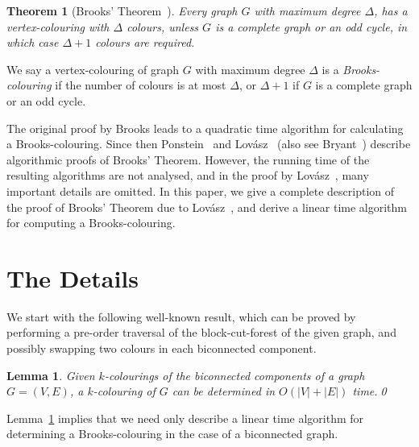 \documentclass{article}
\newtheorem{lemma}{Lemma}
\newtheorem{theorem}{Theorem}
\begin{document}
\begin{theorem}[Brooks' Theorem~\cite{Brooks41}]
Every graph $G$ with maximum degree $\Delta$, has a vertex-colouring with $\Delta$
colours, unless $G$ is a complete graph or an odd cycle, in which case $\Delta+1$ colours
are required.
\end{theorem}

We say a vertex-colouring of graph $G$ with maximum degree $\Delta$ is a
\emph{Brooks-colouring} if the number of colours is at most $\Delta$, or $\Delta+1$ if
$G$ is a complete graph or an odd cycle. 

The original proof by Brooks leads to a quadratic time algorithm for
calculating a Brooks-colouring. Since then  Ponstein~\cite{Ponstein69} and
Lov{\'a}sz~\cite{Lovasz75} (also see Bryant~\cite{Bryant96}) describe
algorithmic proofs of Brooks' Theorem. However, the running time of the
resulting algorithms are not analysed, and in the proof by
Lov{\'a}sz~\cite{Lovasz75}, many important details are omitted.
In this paper, we give a complete description of the proof of Brooks' Theorem
due to Lov{\'a}sz~\cite{Lovasz75}, and derive a linear time algorithm for
computing a Brooks-colouring.  


\section{The Details}

We start with the following well-known result,
which can be proved by performing a pre-order traversal of the block-cut-forest
of the given graph, and possibly swapping two colours in each biconnected
component.

\begin{lemma}
\label{lem:NonBiconnected}
Given $k$-colourings of the biconnected components of a graph $G=(V,E)$, a $k$-colouring
of $G$ can be determined in $O(|V|+|E|)$ time.\qed
\end{lemma}


Lemma~\ref{lem:NonBiconnected} implies that we need only describe a linear time
algorithm  for determining a Brooks-colouring in the case of a biconnected
graph. 
\end{document}
